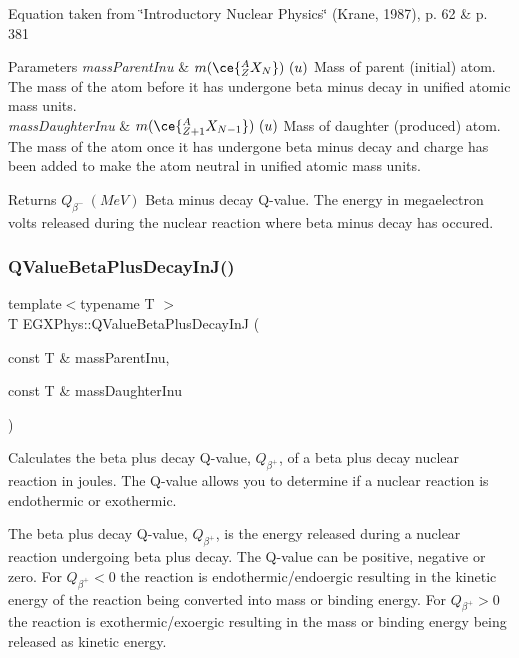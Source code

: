 Equation taken from \char`\"{}\+Introductory Nuclear Physics\char`\"{} (Krane, 1987), p. 62 \& p. 381


\begin{DoxyParams}{Parameters}
{\em mass\+Parent\+Inu} & $m(\ce{ ^{A}_{Z}X_{N} })\ (u)$ Mass of parent (initial) atom. The mass of the atom before it has undergone beta minus decay in unified atomic mass units. \\
\hline
{\em mass\+Daughter\+Inu} & $m(\ce{ ^{A}_{Z{+1}}X_{N-1} })\ (u)$ Mass of daughter (produced) atom. The mass of the atom once it has undergone beta minus decay and charge has been added to make the atom neutral in unified atomic mass units. \\
\hline
\end{DoxyParams}
\begin{DoxyReturn}{Returns}
$Q_{\beta^-}\ (MeV)$ Beta minus decay Q-\/value. The energy in megaelectron volts released during the nuclear reaction where beta minus decay has occured. 
\end{DoxyReturn}
\mbox{\label{group___q_value_ga066fe9a9816a204c801c557a85bc60df}} 
\subsubsection{\texorpdfstring{Q\+Value\+Beta\+Plus\+Decay\+In\+J()}{QValueBetaPlusDecayInJ()}}
{\footnotesize\ttfamily template$<$typename T $>$ \\
T E\+G\+X\+Phys\+::\+Q\+Value\+Beta\+Plus\+Decay\+InJ (\begin{DoxyParamCaption}\item[{const T \&}]{mass\+Parent\+Inu,  }\item[{const T \&}]{mass\+Daughter\+Inu }\end{DoxyParamCaption})}



Calculates the beta plus decay Q-\/value, $Q_{\beta^+}$, of a beta plus decay nuclear reaction in joules. The Q-\/value allows you to determine if a nuclear reaction is endothermic or exothermic. 

The beta plus decay Q-\/value, $Q_{\beta^+}$, is the energy released during a nuclear reaction undergoing beta plus decay. The Q-\/value can be positive, negative or zero. For $Q_{\beta^+} < 0$ the reaction is endothermic/endoergic resulting in the kinetic energy of the reaction being converted into mass or binding energy. For $Q_{\beta^+} > 0$ the reaction is exothermic/exoergic resulting in the mass or binding energy being released as kinetic energy.

